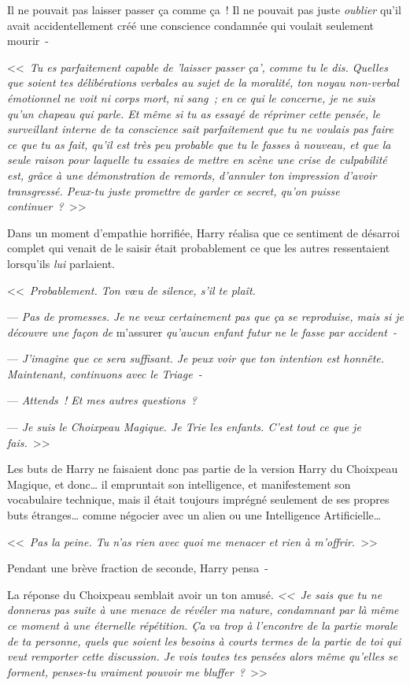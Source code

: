 Il ne pouvait pas laisser passer ça comme ça~! Il ne pouvait pas juste \emph{oublier} qu'il avait accidentellement créé une conscience condamnée qui voulait seulement mourir~-

<<~\emph{Tu es parfaitement capable de 'laisser passer ça', comme tu le dis. Quelles que soient tes délibérations verbales au sujet de la moralité, ton noyau non-verbal émotionnel ne voit ni corps mort, ni sang~; en ce qui le concerne, je ne suis qu'un chapeau qui parle. Et même si tu as essayé de réprimer cette pensée, le surveillant interne de ta conscience sait parfaitement que tu ne voulais pas faire ce que tu as fait, qu'il est très peu probable que tu le fasses à nouveau, et que la seule raison pour laquelle tu essaies de mettre en scène une crise de culpabilité est, grâce à une démonstration de remords, d'annuler ton impression d'avoir transgressé. Peux-tu juste promettre de garder ce secret, qu'on puisse continuer~?}~>>

Dans un moment d'empathie horrifiée, Harry réalisa que ce sentiment de désarroi complet qui venait de le saisir était probablement ce que les autres ressentaient lorsqu'ils \emph{lui} parlaient.

<<~\emph{Probablement. Ton vœu de silence, s'il te plaît.}

--- \emph{Pas de promesses. Je ne veux certainement pas que ça se reproduise, mais si je découvre une façon de} m'assurer \emph{qu'aucun enfant futur ne le fasse par accident~-}

--- \emph{J'imagine que ce sera suffisant. Je peux voir que ton intention est honnête. Maintenant, continuons avec le Triage~-}

--- \emph{Attends~! Et mes autres questions~?}

--- \emph{Je suis le Choixpeau Magique. Je Trie les enfants. C'est tout ce que je fais.}~>>

Les buts de Harry ne faisaient donc pas partie de la version Harry du Choixpeau Magique, et donc… il empruntait son intelligence, et manifestement son vocabulaire technique, mais il était toujours imprégné seulement de ses propres buts étranges… comme négocier avec un alien ou une Intelligence Artificielle…

<<~\emph{Pas la peine. Tu n'as rien avec quoi me menacer et rien à m'offrir.}~>>

Pendant une brève fraction de seconde, Harry pensa~-

La réponse du Choixpeau semblait avoir un ton amusé. \emph{<<~Je sais que tu ne donneras pas suite à une menace de révéler ma nature, condamnant par là même ce moment à une éternelle répétition. Ça va trop à l'encontre de la partie morale de ta personne, quels que soient les besoins à courts termes de la partie de toi qui veut remporter cette discussion. Je vois toutes tes pensées alors même qu'elles se forment, penses-tu vraiment pouvoir me bluffer~?}~>>

